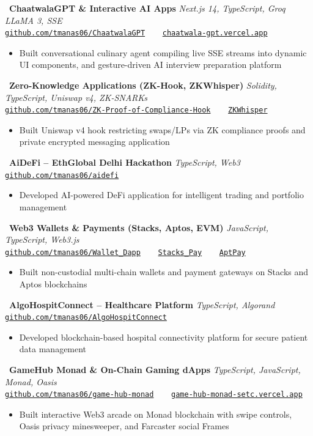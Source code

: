 \documentclass[11pt,a4paper]{article}
\newcommand{\projectentry}[4]{%
  \noindent
  \faGithub\ \textbf{#1} \hfill \textit{#2} \\
  {\small\texttt{#3}}
  \begin{itemize}[leftmargin=1.5em, itemsep=0.5pt, parsep=0pt, topsep=1pt]
    #4
  \end{itemize}
  \vspace{1.5pt}
}
\begin{document}
\projectentry{ChaatwalaGPT \& Interactive AI Apps}%
  {Next.js 14, TypeScript, Groq LLaMA 3, SSE}%
  {\href{https://github.com/tmanas06/ChaatwalaGPT}{github.com/tmanas06/ChaatwalaGPT} \ \textbar\ \ \href{https://chaatwala-gpt.vercel.app}{chaatwala-gpt.vercel.app}}%
  {\item Built conversational culinary agent compiling live SSE streams into dynamic UI components, and gesture-driven AI interview preparation platform}

\projectentry{Zero-Knowledge Applications (ZK-Hook, ZKWhisper)}%
  {Solidity, TypeScript, Uniswap v4, ZK-SNARKs}%
  {\href{https://github.com/tmanas06/ZK-Proof-of-Compliance-Hook}{github.com/tmanas06/ZK-Proof-of-Compliance-Hook} \ \textbar\ \ \href{https://github.com/tmanas06/ZKWhisper}{ZKWhisper}}%
  {\item Built Uniswap v4 hook restricting swaps/LPs via ZK compliance proofs and private encrypted messaging application}

\projectentry{AiDeFi -- EthGlobal Delhi Hackathon}%
  {TypeScript, Web3}%
  {\href{https://github.com/tmanas06/aidefi}{github.com/tmanas06/aidefi}}%
  {\item Developed AI-powered DeFi application for intelligent trading and portfolio management}

\projectentry{Web3 Wallets \& Payments (Stacks, Aptos, EVM)}%
  {JavaScript, TypeScript, Web3.js}%
  {\href{https://github.com/tmanas06/Wallet_Dapp}{github.com/tmanas06/Wallet\_Dapp} \ \textbar\ \ \href{https://github.com/tmanas06/Stacks_Pay}{Stacks\_Pay} \ \textbar\ \ \href{https://github.com/tmanas06/AptPay}{AptPay}}%
  {\item Built non-custodial multi-chain wallets and payment gateways on Stacks and Aptos blockchains}

\projectentry{AlgoHospitConnect -- Healthcare Platform}%
  {TypeScript, Algorand}%
  {\href{https://github.com/tmanas06/AlgoHospitConnect}{github.com/tmanas06/AlgoHospitConnect}}%
  {\item Developed blockchain-based hospital connectivity platform for secure patient data management}

\projectentry{GameHub Monad \& On-Chain Gaming dApps}%
  {TypeScript, JavaScript, Monad, Oasis}%
  {\href{https://github.com/tmanas06/game-hub-monad}{github.com/tmanas06/game-hub-monad} \ \textbar\ \ \href{https://game-hub-monad-setc.vercel.app/game}{game-hub-monad-setc.vercel.app}}%
  {\item Built interactive Web3 arcade on Monad blockchain with swipe controls, Oasis privacy minesweeper, and Farcaster social Frames}
\end{document}
